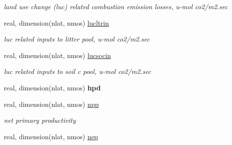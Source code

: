 \begin{DoxyCompactItemize}
\begin{DoxyCompactList}\small\item\em land use change (luc) related combustion emission losses, u-\/mol co2/m2.\+sec \end{DoxyCompactList}\item 
\hypertarget{structctem__statevars_1_1veg__rot_ad6b7cab2f6af48ae399dee3e722eab6b}{}real, dimension(nlat, nmos) \hyperlink{structctem__statevars_1_1veg__rot_ad6b7cab2f6af48ae399dee3e722eab6b}{lucltrin}\label{structctem__statevars_1_1veg__rot_ad6b7cab2f6af48ae399dee3e722eab6b}

\begin{DoxyCompactList}\small\item\em luc related inputs to litter pool, u-\/mol co2/m2.\+sec \end{DoxyCompactList}\item 
\hypertarget{structctem__statevars_1_1veg__rot_a3607609cc4766b58b177306d4130c849}{}real, dimension(nlat, nmos) \hyperlink{structctem__statevars_1_1veg__rot_a3607609cc4766b58b177306d4130c849}{lucsocin}\label{structctem__statevars_1_1veg__rot_a3607609cc4766b58b177306d4130c849}

\begin{DoxyCompactList}\small\item\em luc related inputs to soil c pool, u-\/mol co2/m2.\+sec \end{DoxyCompactList}\item 
\hypertarget{structctem__statevars_1_1veg__rot_ae0f7868cf2332bc69bcecf13408bb894}{}real, dimension(nlat, nmos) {\bfseries hpd}\label{structctem__statevars_1_1veg__rot_ae0f7868cf2332bc69bcecf13408bb894}

\item 
\hypertarget{structctem__statevars_1_1veg__rot_a25b7905aae5d130f67504f5299b3a207}{}real, dimension(nlat, nmos) \hyperlink{structctem__statevars_1_1veg__rot_a25b7905aae5d130f67504f5299b3a207}{npp}\label{structctem__statevars_1_1veg__rot_a25b7905aae5d130f67504f5299b3a207}

\begin{DoxyCompactList}\small\item\em net primary productivity \end{DoxyCompactList}\item 
\hypertarget{structctem__statevars_1_1veg__rot_a41749e18889a236c3e0874501f4e33ca}{}real, dimension(nlat, nmos) \hyperlink{structctem__statevars_1_1veg__rot_a41749e18889a236c3e0874501f4e33ca}{nep}\label{structctem__statevars_1_1veg__rot_a41749e18889a236c3e0874501f4e33ca}


\end{DoxyCompactItemize}
